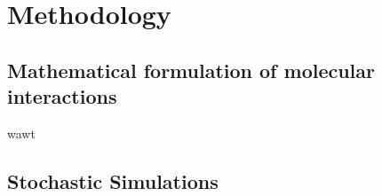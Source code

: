 
\chapter{Methodology}

\ifpdf
    \graphicspath{{Chapter2/Figs/Raster/}{Chapter2/Figs/PDF/}{Chapter2/Figs/}}
\else
    \graphicspath{{Chapter2/Figs/Vector/}{Chapter2/Figs/}}
\fi


\section[Stochastic Simulations]{Mathematical formulation of molecular
  interactions}
wawt
% 
% 

\section[Stochastic Simulations]{Stochastic Simulations}


